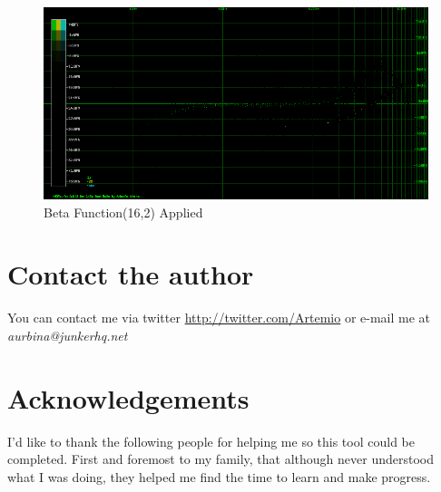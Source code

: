\documentclass[10pt,a4paper]{report}
\begin{document}
\begin{figure}[H]
	\centering
	\includegraphics[width=1\linewidth]{plots/BetaFunctionPlot_5_Data}
	\caption[Beta Function(16,2)]{Beta Function(16,2) Applied}
	\label{fig:betafunctionplot5data}
\end{figure}


\section{Contact the author}
\label{contact}

You can contact me via twitter \url{http://twitter.com/Artemio} or e-mail me at \textit{aurbina@junkerhq.net}

\section{Acknowledgements}

I'd like to thank the following people for helping me so this tool could be completed. First and foremost to my family, that although never understood what I was doing, they helped me find the time to learn and make progress.
\end{document}
